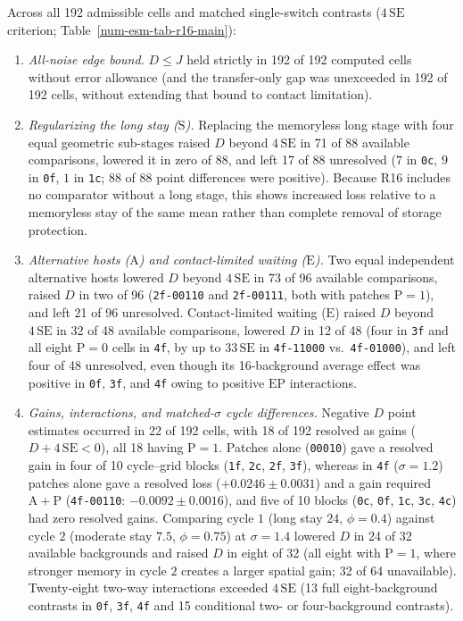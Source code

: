 Across all 192 admissible cells and matched single-switch contrasts ($4\,\mathrm{SE}$ criterion; Table~\ref{num-esm-tab-r16-main}):
\begin{enumerate}
\item \emph{All-noise edge bound.} $D \le J$ held strictly in 192 of 192 computed cells without error allowance (and the transfer-only gap was unexceeded in 192 of 192 cells, without extending that bound to contact limitation).
\item \emph{Regularizing the long stay ($\mathrm{S}$).} Replacing the memoryless long stage with four equal geometric sub-stages raised $D$ beyond $4\,\mathrm{SE}$ in 71 of 88 available comparisons, lowered it in zero of 88, and left 17 of 88 unresolved ($7$ in \texttt{0c}, $9$ in \texttt{0f}, $1$ in \texttt{1c}; 88 of 88 point differences were positive). Because R16 includes no comparator without a long stage, this shows increased loss relative to a memoryless stay of the same mean rather than complete removal of storage protection.
\item \emph{Alternative hosts ($\mathrm{A}$) and contact-limited waiting ($\mathrm{E}$).} Two equal independent alternative hosts lowered $D$ beyond $4\,\mathrm{SE}$ in 73 of 96 available comparisons, raised $D$ in two of 96 (\texttt{2f-00110} and \texttt{2f-00111}, both with patches $\mathrm{P} = 1$), and left 21 of 96 unresolved. Contact-limited waiting ($\mathrm{E}$) raised $D$ beyond $4\,\mathrm{SE}$ in 32 of 48 available comparisons, lowered $D$ in 12 of 48 (four in \texttt{3f} and all eight $\mathrm{P} = 0$ cells in \texttt{4f}, by up to $33\,\mathrm{SE}$ in \texttt{4f-11000} vs.\ \texttt{4f-01000}), and left four of 48 unresolved, even though its 16-background average effect was positive in \texttt{0f}, \texttt{3f}, and \texttt{4f} owing to positive $\mathrm{EP}$ interactions.
\item \emph{Gains, interactions, and matched-$\sigma$ cycle differences.} Negative $D$ point estimates occurred in 22 of 192 cells, with 18 of 192 resolved as gains ($D + 4\,\mathrm{SE} < 0$), all 18 having $\mathrm{P} = 1$. Patches alone (\texttt{00010}) gave a resolved gain in four of 10 cycle--grid blocks (\texttt{1f}, \texttt{2c}, \texttt{2f}, \texttt{3f}), whereas in \texttt{4f} ($\sigma = 1.2$) patches alone gave a resolved loss ($+0.0246 \pm 0.0031$) and a gain required $\mathrm{A} + \mathrm{P}$ (\texttt{4f-00110}: $-0.0092 \pm 0.0016$), and five of 10 blocks (\texttt{0c}, \texttt{0f}, \texttt{1c}, \texttt{3c}, \texttt{4c}) had zero resolved gains. Comparing cycle $1$ (long stay $24$, $\phi = 0.4$) against cycle $2$ (moderate stay $7.5$, $\phi = 0.75$) at $\sigma = 1.4$ lowered $D$ in 24 of 32 available backgrounds and raised $D$ in eight of 32 (all eight with $\mathrm{P} = 1$, where stronger memory in cycle $2$ creates a larger spatial gain; 32 of 64 unavailable). Twenty-eight two-way interactions exceeded $4\,\mathrm{SE}$ (13 full eight-background contrasts in \texttt{0f}, \texttt{3f}, \texttt{4f} and 15 conditional two- or four-background contrasts).

\end{enumerate}
